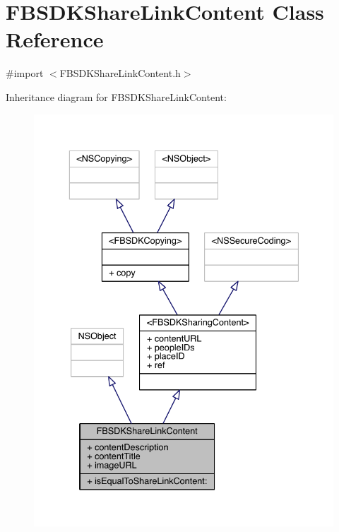 \hypertarget{interface_f_b_s_d_k_share_link_content}{\section{F\-B\-S\-D\-K\-Share\-Link\-Content Class Reference}
\label{interface_f_b_s_d_k_share_link_content}
}


{\ttfamily \#import $<$F\-B\-S\-D\-K\-Share\-Link\-Content.\-h$>$}



Inheritance diagram for F\-B\-S\-D\-K\-Share\-Link\-Content\-:
\nopagebreak
\begin{figure}[H]
\begin{center}
\leavevmode
\includegraphics[width=336pt]{interface_f_b_s_d_k_share_link_content__inherit__graph}
\end{center}
\end{figure}


